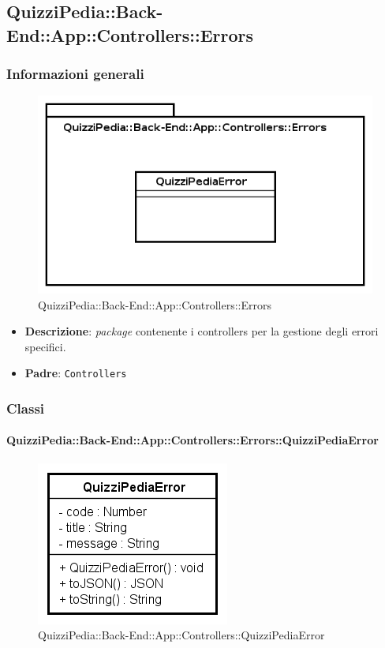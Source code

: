 \subsection{QuizziPedia::Back-End::App::Controllers::Errors}
\subsubsection{Informazioni generali}
\label{QuizziPedia::Back-End::App::Controllers::Errors}
\begin{figure}[ht]
	\centering
	\includegraphics[scale=0.8]{UML/Package/QuizziPedia_Back-End_App_Controllers_Errors.png}
	\caption{QuizziPedia::Back-End::App::Controllers::Errors}
\end{figure}
\FloatBarrier


	\begin{itemize}
		\item \textbf{Descrizione}:
		\textit{package} contenente i controllers per la gestione degli errori specifici.
		\item \textbf{Padre}: \texttt{Controllers}
	\end{itemize}
\subsubsection{Classi}
\paragraph{QuizziPedia::Back-End::App::Controllers::Errors::QuizziPediaError}
\begin{figure}[ht]
	\centering
	\includegraphics[scale=0.8]{UML/Classi/Back-End/QuizziPedia_Back-End_App_Controllers_Errors_QuizziPediaError.png}
	\caption{QuizziPedia::Back-End::App::Controllers::QuizziPediaError}
\end{figure}
\FloatBarrier


